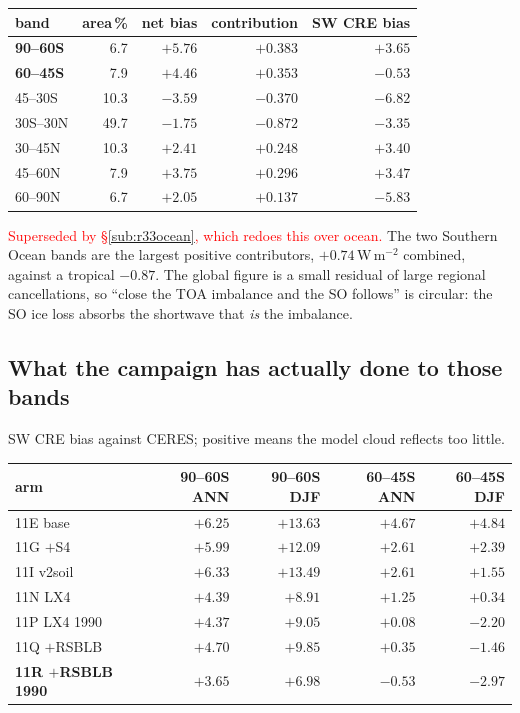 \documentclass[10pt]{article}
\begin{document}
\begin{center}\small
\begin{tabular}{lrrrr}
\toprule
band & area\,\% & net bias & contribution & SW CRE bias \\
\midrule
\textbf{90--60S} & 6.7 & $\mathbf{+5.76}$ & $\mathbf{+0.383}$ & $+3.65$ \\
\textbf{60--45S} & 7.9 & $\mathbf{+4.46}$ & $\mathbf{+0.353}$ & $-0.53$ \\
45--30S & 10.3 & $-3.59$ & $-0.370$ & $-6.82$ \\
30S--30N & 49.7 & $-1.75$ & $-0.872$ & $-3.35$ \\
30--45N & 10.3 & $+2.41$ & $+0.248$ & $+3.40$ \\
45--60N & 7.9 & $+3.75$ & $+0.296$ & $+3.47$ \\
60--90N & 6.7 & $+2.05$ & $+0.137$ & $-5.83$ \\
\bottomrule
\end{tabular}
\end{center}

\textcolor{red}{Superseded by \S\ref{sub:r33ocean}, which redoes this over ocean.}
The two Southern Ocean bands are the largest positive contributors, $+0.74$\,W\,m$^{-2}$
combined, against a tropical $-0.87$. The global figure is a small residual of large
regional cancellations, so ``close the TOA imbalance and the SO follows'' is circular:
the SO ice loss absorbs the shortwave that \emph{is} the imbalance.

\subsection{What the campaign has actually done to those bands}\label{sub:r33arms}

SW CRE bias against CERES; positive means the model cloud reflects too little.

\begin{center}\small
\begin{tabular}{lrrrr}
\toprule
arm & 90--60S ANN & 90--60S DJF & 60--45S ANN & 60--45S DJF \\
\midrule
11E base & $+6.25$ & $+13.63$ & $+4.67$ & $+4.84$ \\
11G $+$S4 & $+5.99$ & $+12.09$ & $+2.61$ & $+2.39$ \\
11I v2soil & $+6.33$ & $+13.49$ & $+2.61$ & $+1.55$ \\
11N LX4 & $+4.39$ & $+8.91$ & $+1.25$ & $+0.34$ \\
11P LX4 1990 & $+4.37$ & $+9.05$ & $+0.08$ & $-2.20$ \\
11Q $+$RSBLB & $+4.70$ & $+9.85$ & $+0.35$ & $-1.46$ \\
\textbf{11R $+$RSBLB 1990} & $\mathbf{+3.65}$ & $\mathbf{+6.98}$ & $\mathbf{-0.53}$ & $\mathbf{-2.97}$ \\
\bottomrule
\end{tabular}
\end{center}
\end{document}
